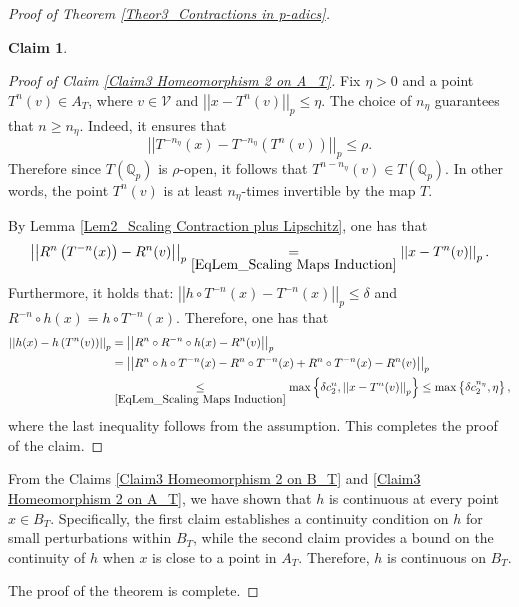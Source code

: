 \documentclass[a4paper, 12pt]{article}
\theoremstyle{definition}
\newtheorem{claim}{Claim}[section]
\begin{document}
\begin{proof}[Proof of Theorem \ref{Theor3_Contractions in p-adics}]
\begin{claim}
		\end{claim}
		
		\begin{proof}[Proof of Claim \ref{Claim3 Homeomorphism 2 on A_T}]
			Fix $  \eta  > 0$ and a point $T^{n} \left(  v  \right)  \in A_{T}$, where $v \in \mathcal{V}$ and $ \left| \left|  x - T^{n}(v)  \right|  \right|_{p} \le  \eta $. The choice of $n_{ \eta} $ guarantees that $n \ge n_{ \eta}$. Indeed, it ensures that  
			$$ \left| \left|  T^{-n_{ \eta}}(x) -  T^{- n_{ \eta}} \left(  T^{n}(v)  \right)   \right|  \right|_{p} \le \rho. $$
			Therefore since $T \left(  \mathbb{Q}_{p}  \right) $ is $\rho$-open, it follows that  $T^{n - n_{ \eta}}(v) \in T \left(  \mathbb{Q}_{p}  \right) $. In other words, the point $T^{n} \left(  v  \right) $ is at least $n_{ \eta}$-times invertible by the map $T$. 
			
			
			By Lemma \ref{Lem2_Scaling Contraction plus Lipschitz}, one has that
			$$  \left| \left|  R^{n} \left(  T^{-n}(x)  \right)  - R^{n}(v)  \right|  \right|_{p}   \underset{\eqref{EqLem_Scaling Maps Induction}}{=}    \left| \left|  x - T^{n}(v)  \right|  \right|_{p} . $$ 
			Furthermore, it holds that: $  \left| \left|  h\circ T^{-n}(x)  - T^{-n}(x)  \right|  \right|_{p} \le \delta$ and $ R^{-n}\circ h(x)  = h\circ T^{-n} (x) $.
			Therefore,  one has that
			\begin{align*}
				\left| \left|  h(x) - h \left(  T^{n}(v)  \right)   \right|  \right|_{p}  & =    \left| \left|  R^{n}\circ R^{-n} \circ h(x) - R^{n}(v)  \right|  \right|_{p}  \\ 
				&=    \left| \left|  R^{n}\circ h \circ T^{-n}(x) - R^{n}\circ T^{-n} (x) + R^{n} \circ T^{-n}(x)   - R^{n}(v)  \right|  \right|_{p}  \\ 
				& \underset{\eqref{EqLem_Scaling Maps Induction}}{\le}   \max  \left\{  \delta  c_{2}^{n},    \left| \left|  x - T^{n}(v)  \right|  \right|_{p}  \right\}     \le   \max \left\{  \delta  c_{2}^{n_{ \eta}} ,    \eta  \right\} , 
			\end{align*}
			where the last inequality follows from the assumption. 
			This completes the proof of the claim. 
			
		\end{proof}
		
		
		From the Claims \ref{Claim3 Homeomorphism 2 on B_T} and \ref{Claim3 Homeomorphism 2 on A_T}, we have shown that $h$ is continuous at every point $x \in B_{T}$. Specifically, the first claim establishes a continuity condition on $h$ for small perturbations within $B_{T}$, while the second claim provides a bound on the continuity of $h$ when $x$ is close to a point in $A_{T}$. Therefore, $h$ is continuous on $B_{T}$. 
		
		
		
		The proof of the theorem is complete. 
		
		
	\end{proof}
	
\end{document}
